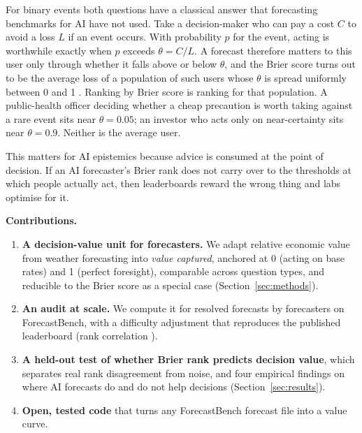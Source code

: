 \documentclass[10pt]{article}
\begin{document}
For binary events both questions have a classical answer that forecasting benchmarks for AI have not used. Take a decision-maker who can pay a cost $C$ to avoid a loss $L$ if an event occurs. With probability $p$ for the event, acting is worthwhile exactly when $p$ exceeds $\theta=C/L$. A forecast therefore matters to this user only through whether it falls above or below $\theta$, and the Brier score turns out to be the average loss of a population of such users whose $\theta$ is spread uniformly between 0 and 1 \cite{schervish1989,ehm2016}. Ranking by Brier score is ranking for that population. A public-health officer deciding whether a cheap precaution is worth taking against a rare event sits near $\theta=0.05$; an investor who acts only on near-certainty sits near $\theta=0.9$. Neither is the average user.

This matters for AI epistemics because advice is consumed at the point of decision. If an AI forecaster's Brier rank does not carry over to the thresholds at which people actually act, then leaderboards reward the wrong thing and labs optimise for it.

\noindent\textbf{Contributions.}
\begin{enumerate}
\item \textbf{A decision-value unit for forecasters.} We adapt relative economic value from weather forecasting \cite{murphy1977,richardson2000} into \emph{value captured}, anchored at 0 (acting on base rates) and 1 (perfect foresight), comparable across question types, and reducible to the Brier score as a special case (Section~\ref{sec:methods}).
\item \textbf{An audit at scale.} We compute it for \nForecasts{} resolved forecasts by \nListed{} forecasters on ForecastBench, with a difficulty adjustment that reproduces the published leaderboard (rank correlation \reproRhoOverall).
\item \textbf{A held-out test of whether Brier rank predicts decision value}, which separates real rank disagreement from noise, and four empirical findings on where AI forecasts do and do not help decisions (Section~\ref{sec:results}).
\item \textbf{Open, tested code} that turns any ForecastBench forecast file into a value curve.
\end{enumerate}
\end{document}
